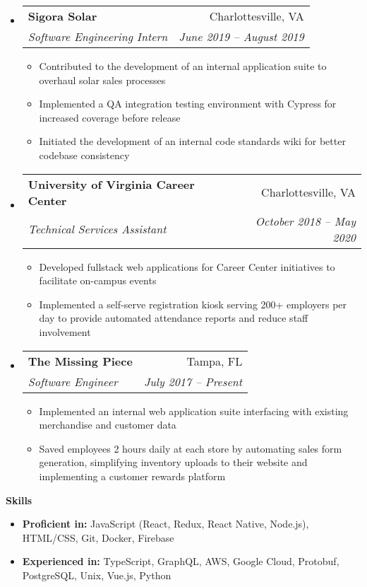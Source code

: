 \documentclass[letterpaper,12pt]{article}[leftmargin=*]
\makeatletter
\def \entryspacing {-0pt}
\renewcommand{\section}[2]{\vspace{5pt}
  \colorbox{secondary}{\color{white}\raggedbottom\normalsize\textbf{{#1}{\hspace{7pt}#2}}}
}
\newcommand{\resumeEntryStart}{\begin{itemize}[leftmargin=2.5mm]}
\newcommand{\resumeEntryEnd}{\end{itemize}\vspace{\entryspacing}}
\newcommand{\resumeItemListStart}{\begin{itemize}[leftmargin=4.5mm]}
\newcommand{\resumeItemListEnd}{\end{itemize}}
\newcommand{\resumeItem}[1]{
  \item\small{
    {#1 \vspace{-2pt}}
  }
}
\newcommand{\resumeEntryTSDL}[4]{
  \vspace{-1pt}\item[]
    \begin{tabular*}{0.97\textwidth}{l@{\extracolsep{\fill}}r}
      \textbf{\color{primary}#1} & {\firabook\color{accent}\small#2} \\
      \textit{\color{accent}\small#3} & \textit{\color{accent}\small#4} \\
    \end{tabular*}\vspace{-7pt}
}
\newcommand{\resumeEntryS}[2]{
  \item[]\small{
    \textbf{\color{primary}#1} #2\vspace{-6pt}
  }
}
\makeatother
\begin{document}
  \resumeEntryStart
    \resumeEntryTSDL
      {Sigora Solar}
      {Charlottesville, VA}
      {Software Engineering Intern}
      {June 2019 -- August 2019}
    \resumeItemListStart
      \resumeItem {Contributed to the development of an internal application suite to overhaul solar sales processes}
      \resumeItem {Implemented a QA integration testing environment with Cypress for increased coverage before release}
      \resumeItem {Initiated the development of an internal code standards wiki for better codebase consistency}
    \resumeItemListEnd
  \resumeEntryEnd

  \resumeEntryStart
    \resumeEntryTSDL
      {University of Virginia Career Center}
      {Charlottesville, VA}
      {Technical Services Assistant}
      {October 2018 -- May 2020}
    \resumeItemListStart
      \resumeItem {Developed fullstack web applications for Career Center initiatives to facilitate on-campus events}
      \resumeItem {Implemented a self-serve registration kiosk serving 200+ employers per day to provide automated attendance reports and reduce staff involvement}
    \resumeItemListEnd
  \resumeEntryEnd

  \resumeEntryStart
    \resumeEntryTSDL
      {The Missing Piece}
      {Tampa, FL}
      {Software Engineer}
      {July 2017 -- Present}
    \resumeItemListStart
      \resumeItem {Implemented an internal web application suite interfacing with existing merchandise and customer data}
      \resumeItem {Saved employees 2 hours daily at each store by automating sales form generation, simplifying inventory uploads to their website and implementing a customer rewards platform}
    \resumeItemListEnd
  \resumeEntryEnd

\section{\faGears}{Skills}
  \resumeEntryStart
  \resumeEntryS
    {Proficient in:}
    {JavaScript (React, Redux, React Native, Node.js), HTML/CSS, Git, Docker, Firebase}
  \resumeEntryS
    {Experienced in:}
    {TypeScript, GraphQL, AWS, Google Cloud, Protobuf, PostgreSQL, Unix, Vue.js, Python}
  \resumeEntryEnd
\end{document}
